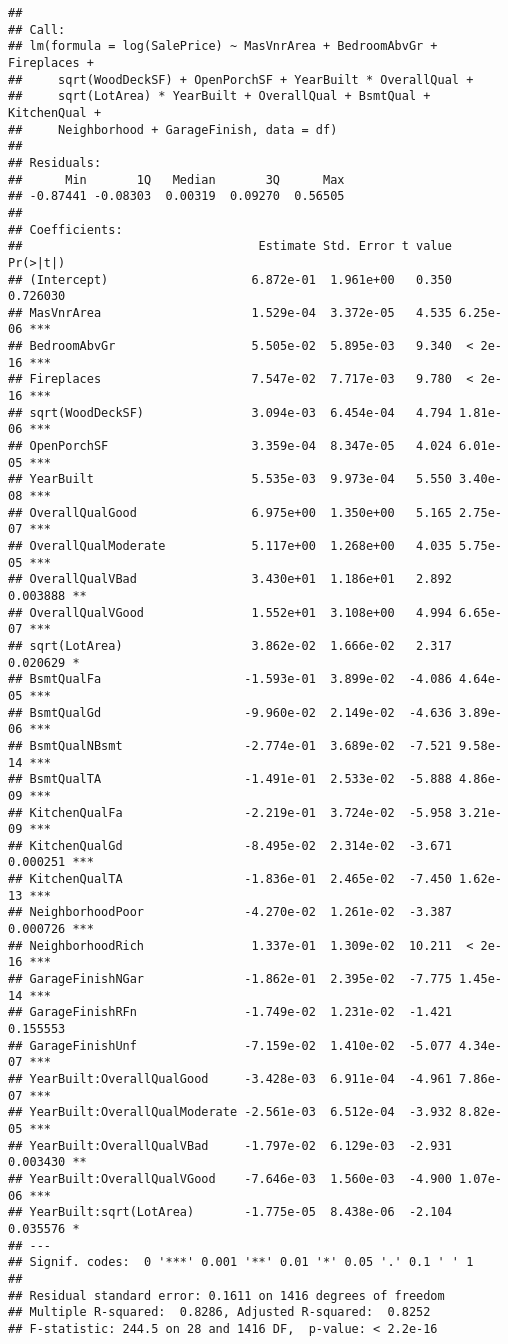 \documentclass[
]{article}
\begin{document}
\begin{verbatim}
## 
## Call:
## lm(formula = log(SalePrice) ~ MasVnrArea + BedroomAbvGr + Fireplaces + 
##     sqrt(WoodDeckSF) + OpenPorchSF + YearBuilt * OverallQual + 
##     sqrt(LotArea) * YearBuilt + OverallQual + BsmtQual + KitchenQual + 
##     Neighborhood + GarageFinish, data = df)
## 
## Residuals:
##      Min       1Q   Median       3Q      Max 
## -0.87441 -0.08303  0.00319  0.09270  0.56505 
## 
## Coefficients:
##                                 Estimate Std. Error t value Pr(>|t|)    
## (Intercept)                    6.872e-01  1.961e+00   0.350 0.726030    
## MasVnrArea                     1.529e-04  3.372e-05   4.535 6.25e-06 ***
## BedroomAbvGr                   5.505e-02  5.895e-03   9.340  < 2e-16 ***
## Fireplaces                     7.547e-02  7.717e-03   9.780  < 2e-16 ***
## sqrt(WoodDeckSF)               3.094e-03  6.454e-04   4.794 1.81e-06 ***
## OpenPorchSF                    3.359e-04  8.347e-05   4.024 6.01e-05 ***
## YearBuilt                      5.535e-03  9.973e-04   5.550 3.40e-08 ***
## OverallQualGood                6.975e+00  1.350e+00   5.165 2.75e-07 ***
## OverallQualModerate            5.117e+00  1.268e+00   4.035 5.75e-05 ***
## OverallQualVBad                3.430e+01  1.186e+01   2.892 0.003888 ** 
## OverallQualVGood               1.552e+01  3.108e+00   4.994 6.65e-07 ***
## sqrt(LotArea)                  3.862e-02  1.666e-02   2.317 0.020629 *  
## BsmtQualFa                    -1.593e-01  3.899e-02  -4.086 4.64e-05 ***
## BsmtQualGd                    -9.960e-02  2.149e-02  -4.636 3.89e-06 ***
## BsmtQualNBsmt                 -2.774e-01  3.689e-02  -7.521 9.58e-14 ***
## BsmtQualTA                    -1.491e-01  2.533e-02  -5.888 4.86e-09 ***
## KitchenQualFa                 -2.219e-01  3.724e-02  -5.958 3.21e-09 ***
## KitchenQualGd                 -8.495e-02  2.314e-02  -3.671 0.000251 ***
## KitchenQualTA                 -1.836e-01  2.465e-02  -7.450 1.62e-13 ***
## NeighborhoodPoor              -4.270e-02  1.261e-02  -3.387 0.000726 ***
## NeighborhoodRich               1.337e-01  1.309e-02  10.211  < 2e-16 ***
## GarageFinishNGar              -1.862e-01  2.395e-02  -7.775 1.45e-14 ***
## GarageFinishRFn               -1.749e-02  1.231e-02  -1.421 0.155553    
## GarageFinishUnf               -7.159e-02  1.410e-02  -5.077 4.34e-07 ***
## YearBuilt:OverallQualGood     -3.428e-03  6.911e-04  -4.961 7.86e-07 ***
## YearBuilt:OverallQualModerate -2.561e-03  6.512e-04  -3.932 8.82e-05 ***
## YearBuilt:OverallQualVBad     -1.797e-02  6.129e-03  -2.931 0.003430 ** 
## YearBuilt:OverallQualVGood    -7.646e-03  1.560e-03  -4.900 1.07e-06 ***
## YearBuilt:sqrt(LotArea)       -1.775e-05  8.438e-06  -2.104 0.035576 *  
## ---
## Signif. codes:  0 '***' 0.001 '**' 0.01 '*' 0.05 '.' 0.1 ' ' 1
## 
## Residual standard error: 0.1611 on 1416 degrees of freedom
## Multiple R-squared:  0.8286, Adjusted R-squared:  0.8252 
## F-statistic: 244.5 on 28 and 1416 DF,  p-value: < 2.2e-16
\end{verbatim}
\end{document}
